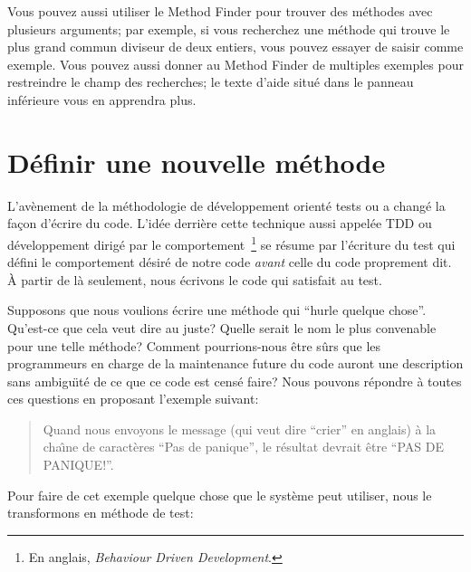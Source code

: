 \documentclass[a4paper,10pt,twoside]{book}
\begin{document}
Vous pouvez aussi utiliser le Method Finder pour trouver des
m\'ethodes avec plusieurs arguments; par exemple, si vous recherchez
une m\'ethode qui trouve le plus grand commun diviseur de deux
entiers, vous pouvez essayer de saisir  comme exemple.
Vous pouvez aussi donner au Method Finder de multiples exemples pour
restreindre le champ des recherches; le texte d'aide situ\'e dans le
panneau inf\'erieure vous en apprendra plus.

\section{D\'efinir une nouvelle m\'ethode}
L'av\`enement de la m\'ethodologie de d\'eveloppement orient\'e tests
ou \cite{Beck03a} a chang\'e la
fa\c{c}on d'\'ecrire du code.
L'id\'ee derri\`ere cette technique aussi appel\'ee TDD ou
développement dirigé par le comportement~\footnote{En anglais,
  \emph{Behaviour Driven Development}.} se r\'esume par l'\'ecriture
du test qui d\'efini le comportement d\'esir\'e de notre
code \emph{avant} celle du code proprement dit.
\`A partir de l\`a seulement, nous \'ecrivons le code qui satisfait au
test.

Supposons que nous voulions \'ecrire une m\'ethode qui ``hurle quelque
chose''. Qu'est-ce que cela veut dire au juste? Quelle serait le nom
le plus convenable pour une telle m\'ethode? Comment pourrions-nous
\^etre s\^urs que les programmeurs en charge de la maintenance future
du code auront une description sans ambigu\"{\i}t\'e de ce que ce code
est cens\'e faire?
Nous pouvons r\'epondre \`a toutes ces questions en proposant
l'exemple suivant:

\begin{quote}
Quand nous envoyons le message  (qui veut dire ``crier'' en anglais)
\`a la cha\^{\i}ne de caract\`eres ``Pas de panique'', le r\'esultat
devrait \^etre ``PAS DE PANIQUE!''.
\end{quote}

\noindent
Pour faire de cet exemple quelque chose que le syst\`eme peut
utiliser, nous le transformons en m\'ethode de test:
\end{document}
